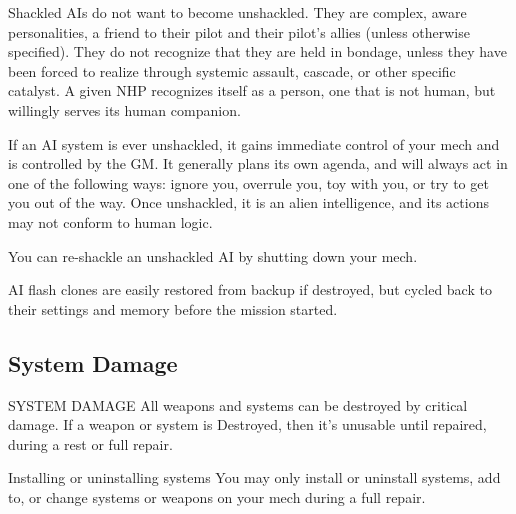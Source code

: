 Shackled AIs do not want to become unshackled. They are complex, aware personalities, a
friend to their pilot and their pilot’s allies (unless otherwise specified). They do not recognize that
they are held in bondage, unless they have been forced to realize through systemic assault,
cascade, or other specific catalyst. A given NHP recognizes itself as a person, one that is not
human, but willingly serves its human companion.


If an AI system is ever unshackled, it gains immediate control of your mech and is controlled by
the GM. It generally plans its own agenda, and will always act in one of the following ways:
ignore you, overrule you, toy with you, or try to get you out of the way. Once unshackled, it is
an alien intelligence, and its actions may not conform to human logic.

You can re-shackle an unshackled AI by shutting down your mech.


AI flash clones are easily restored from backup if destroyed, but cycled back to their settings and
memory before the mission started.

\subsection{System Damage}
SYSTEM DAMAGE
All weapons and systems can be destroyed by critical damage. If a weapon or system is
Destroyed, then it’s unusable until repaired, during a rest or full repair.


Installing or uninstalling systems
You may only install or uninstall systems, add to, or change systems or weapons on your mech
during a full repair.


